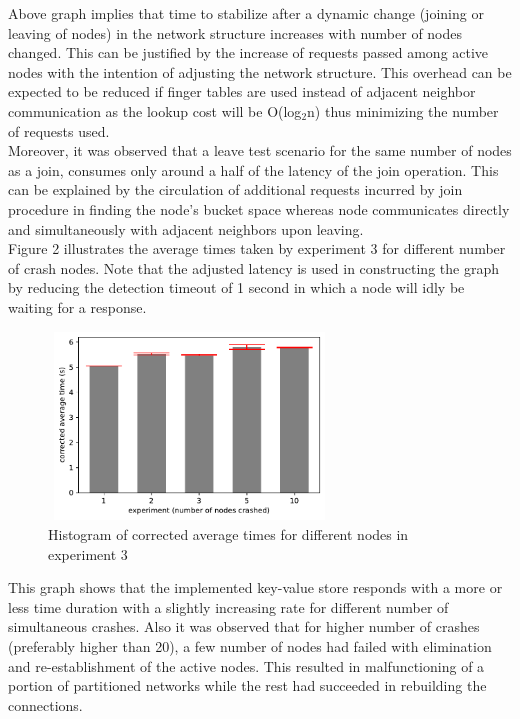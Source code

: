 \documentclass[
    a4paper,
    twocolumn,
]{article}
\begin{document}
Above graph implies that time to stabilize after a dynamic change (joining or leaving of nodes) in the network structure increases with number of nodes changed. This can be justified by the increase of requests passed among active nodes with the intention of adjusting the network structure. This overhead can be expected to be reduced if finger tables are used instead of adjacent neighbor communication as the lookup cost will be O(log$_2$n) thus minimizing the number of requests used.\\

Moreover, it was observed that a leave test scenario for the same number of nodes as a join, consumes only around a half of the latency of the join operation. This can be explained by the circulation of additional requests incurred by join procedure in finding the node's bucket space whereas node communicates directly and simultaneously with adjacent neighbors upon leaving.\\

Figure 2 illustrates the average times taken by experiment 3 for different number of crash nodes. Note that the adjusted latency is used in constructing the graph by reducing the detection timeout of 1 second in which a node will idly be waiting for a response.\\

\setlength{\intextsep}{10pt plus 2pt minus 0pt}
\begin{figure}[!ht]
	\centering
	\includegraphics[width=7.5cm, height=5cm]{crash_bar.pdf}
	\caption{Histogram of corrected average times for different nodes in experiment 3}
\end{figure}

This graph shows that the implemented key-value store responds with a more or less time duration with a slightly increasing rate for different number of simultaneous crashes. Also it was observed that for higher number of crashes (preferably higher than 20), a few number of nodes had failed with elimination and re-establishment of the active nodes. This resulted in malfunctioning of a portion of partitioned networks while the rest had succeeded in rebuilding the connections.\\
\end{document}
